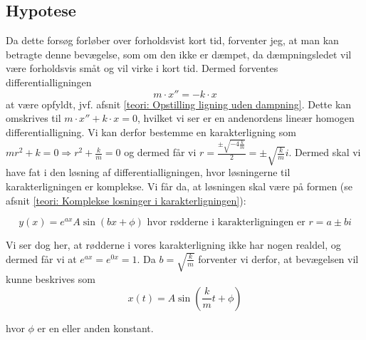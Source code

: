 \subsection{Hypotese}\label{exp1: Hypotese}
Da dette forsøg forløber over forholdsvist kort tid, forventer jeg, at man kan betragte denne bevægelse, som om den ikke er dæmpet, da dæmpningsledet vil være forholdsvis småt og vil virke i kort tid. 
Dermed forventes differentialligningen 
$$m\cdot x'' = -k \cdot x$$
at være opfyldt, jvf. afsnit \ref{teori: Opstilling ligning uden dampning}.
Dette kan omskrives til $m\cdot x'' + k\cdot x=0$, hvilket vi ser er en andenordens lineær homogen differentialligning. 
Vi kan derfor bestemme en karakterligning som $mr^2 + k = 0 \Rightarrow r^2 + \frac{k}{m} = 0$ og dermed får vi $r = \frac{\pm \sqrt{-4\frac{k}{m}}}{2}=\pm\sqrt{\frac{k}{m}}i$.
Dermed skal vi have fat i den løsning af differentialligningen, hvor løsningerne til karakterligningen er komplekse. 
Vi får da, at løsningen skal være på formen (se afsnit \ref{teori: Komplekse losninger i karakterligningen}):

$$y(x) = e^{ax}A\sin(bx+\phi) \text{ hvor rødderne i karakterligningen er } r = a \pm bi$$

Vi ser dog her, at rødderne i vores karakterligning ikke har nogen realdel, og dermed får vi at $e^{ax}=e^{0x}=1$.
Da $b=\sqrt{\frac{k}{m}}$ forventer vi derfor, at bevægelsen vil kunne beskrives som 
\begin{equation}
x(t)=A\sin (\frac{k}{m}t+\phi)
\label{eq: exp1 hypotese}
\end{equation}

hvor $\phi$ er en eller anden konstant. 

